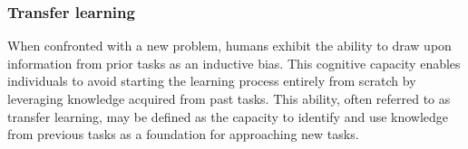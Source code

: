 


\subsubsection{Transfer learning}%
\label{section:TL}


When confronted with a new problem, humans exhibit the ability to draw upon information from prior tasks as an inductive bias. This cognitive capacity enables individuals to avoid starting the learning process entirely from scratch by leveraging knowledge acquired from past tasks. This ability, often referred to as transfer learning, may be defined as the capacity to identify and use knowledge from previous tasks as a foundation for approaching new tasks.

